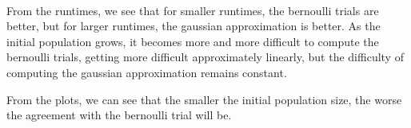 \documentclass{article}
\begin{document}
\paragraph{}
From the runtimes, we see that for smaller runtimes, the bernoulli trials
	are better, but for larger runtimes, the gaussian approximation is better.
As the initial population grows, it becomes more and more difficult to compute
	the bernoulli trials, getting more difficult approximately linearly, 
	but the difficulty of computing the gaussian
	approximation remains constant.

From the plots, we can see that the smaller the initial population size,
	the worse the agreement with the bernoulli trial will be.
\end{document}

